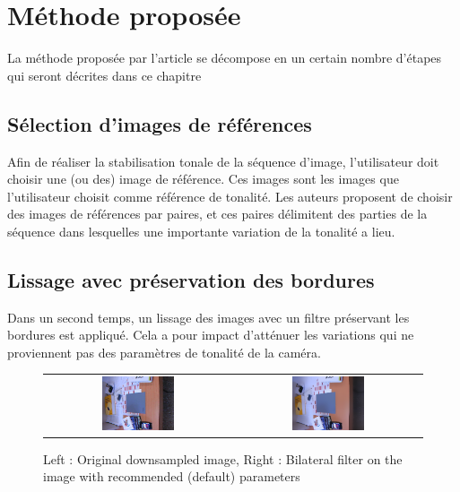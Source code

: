 \section{Méthode proposée}
La méthode proposée par l'article \cite{farbman2011tonal} se décompose en un certain nombre d'étapes qui seront décrites dans ce chapitre

\subsection{Sélection d'images de références}
Afin de réaliser la stabilisation tonale de la séquence d'image, l'utilisateur doit choisir une (ou des) image de référence. Ces images sont les images que l'utilisateur choisit comme référence de tonalité. 
Les auteurs proposent de choisir des images de références par paires, et ces paires délimitent des parties de la séquence dans lesquelles une importante variation de la tonalité a lieu.
 
\subsection{Lissage avec préservation des bordures}
Dans un second temps, un lissage des images avec un filtre préservant les bordures est appliqué. Cela a pour impact d'atténuer les variations qui ne proviennent pas des paramètres de tonalité de la caméra. 

\begin{figure}[h]
\centering
\begin{tabular}{cc}
\includegraphics[width = 0.4\textwidth]{Chapters/Images/bilteral_filter1.png}&
\includegraphics[width = 0.4\textwidth]{Chapters/Images/bilteral_filter2.png}
\end{tabular}
\caption{Left : Original downsampled image, Right : Bilateral filter on the image with recommended (default) parameters}
\end{figure}

